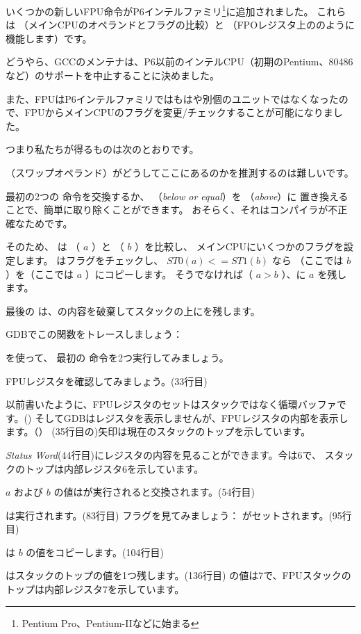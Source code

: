 ﻿
\label{gcc481_o3}

いくつかの新しいFPU命令がP6インテルファミリ\footnote{Pentium Pro、Pentium-IIなどに始まる}に追加されました。 
これらは  （メインCPUのオペランドとフラグの比較）と
 （FPOレジスタ上ののように機能します）です。

どうやら、GCCのメンテナは、P6以前のインテルCPU（初期のPentium、80486など）のサポートを中止することに決めました。

また、FPUはP6インテルファミリではもはや別個のユニットではなくなったので、FPUからメインCPUのフラグを変更/チェックすることが可能になりました。

つまり私たちが得るものは次のとおりです。



 （スワップオペランド）がどうしてここにあるのかを推測するのは難しいです。

最初の2つの \FLD 命令を交換するか、  （\emph{below or equal}）を  （\emph{above}）に
置き換えることで、簡単に取り除くことができます。 
おそらく、それはコンパイラが不正確なためです。

そのため、  は  （ $a$ ）と （ $b$ ）を比較し、
メインCPUにいくつかのフラグを設定します。 
はフラグをチェックし、 $ST0 (a) <= ST1 (b)$ なら
（ここでは $b$ ）を（ここでは $a$ ）にコピーします。
そうでなければ（ $a>b$ ）、に $a$ を残します。

最後の \FSTP は、の内容を破棄してスタックの上にを残します。

GDBでこの関数をトレースしましょう：



を使って、
最初の \FLD 命令を2つ実行してみましょう。

FPUレジスタを確認してみましょう。(33行目)

以前書いたように、FPUレジスタのセットはスタックではなく循環バッファです。()
そしてGDBはレジスタを表示しませんが、FPUレジスタの内部を表示します。（）
(35行目の)矢印は現在のスタックのトップを示しています。

\emph{Status Word}(44行目)にレジスタの内容を見ることができます。今は6で、
スタックのトップは内部レジスタ6を示しています。

$a$ および $b$ の値はが実行されると交換されます。(54行目)

は実行されます。(83行目)
フラグを見てみましょう： \CF がセットされます。(95行目)

 は $b$ の値をコピーします。(104行目)

\FSTP はスタックのトップの値を1つ残します。(136行目)
の値は7で、FPUスタックのトップは内部レジスタ7を示しています。
